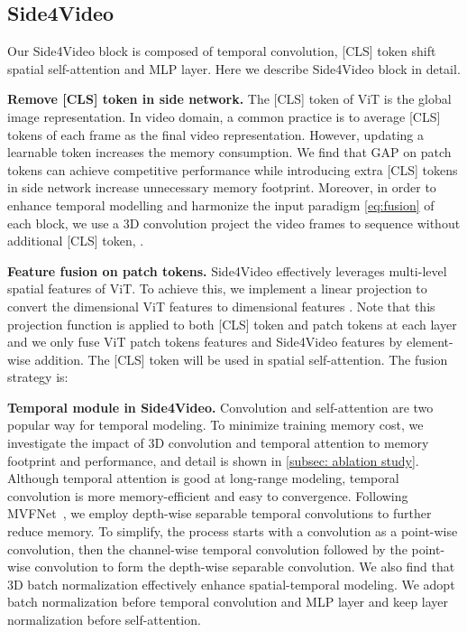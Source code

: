 \documentclass[10pt,twocolumn,letterpaper]{article}
\begin{document}
\subsection{Side4Video}
\label{subsec: side4video}
Our Side4Video block is composed of temporal convolution, [CLS] token shift spatial self-attention and MLP layer. Here we describe Side4Video block in detail.



\noindent\textbf{Remove [CLS] token in side network.} The [CLS] token of ViT is the global image representation. In video domain, a common practice is to average [CLS] tokens of each frame as the final video representation. However, updating a learnable token increases the memory consumption. We find that GAP on patch tokens can achieve competitive performance while introducing extra [CLS] tokens in side network increase unnecessary memory footprint. Moreover, in order to enhance temporal modelling and harmonize the input paradigm \cref{eq:fusion} of each block, we use a 3D convolution project the video frames to sequence  without additional [CLS] token, . 

\noindent\textbf{Feature fusion on patch tokens.} Side4Video effectively leverages multi-level spatial features of ViT. To achieve this, we implement a linear projection  to convert the  dimensional ViT features  to  dimensional features . Note that this projection function is applied to both [CLS] token and patch tokens at each layer and we only fuse ViT patch tokens features  and Side4Video features  by element-wise addition. The [CLS] token will be used in spatial self-attention. The fusion strategy is:




\noindent\textbf{Temporal module in Side4Video.} Convolution \cite{3Dconv, 3dconv2, wu2021mvfnet, wu2021dsanet} and self-attention \cite{timesformer, vivit, videoSwin} are two popular way for temporal modeling. To minimize training memory cost, we investigate the impact of 3D convolution and temporal attention to memory footprint and performance, and detail is shown in \cref{subsec: ablation study}. Although temporal attention is good at long-range modeling, temporal convolution is more memory-efficient and easy to convergence. Following MVFNet~\cite{wu2021mvfnet}, we employ depth-wise separable temporal convolutions to further reduce memory. To simplify, the process starts with a  convolution as a point-wise convolution, then the  channel-wise temporal convolution followed by the  point-wise convolution to form the depth-wise separable convolution.
We also find that 3D batch normalization \cite{bn} effectively enhance spatial-temporal modeling. We adopt batch normalization before temporal convolution and MLP layer and keep layer normalization \cite{ln} before self-attention.
\end{document}
